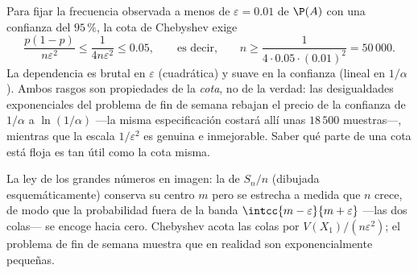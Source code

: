 \begin{example}\label{ex:b2:randomvar:llnnumeric}
Para fijar la frecuencia observada a menos de $\varepsilon = 0.01$ de
$\P(A)$ con una confianza del $95\,\%$, la cota de Chebyshev exige
\[
\frac{p(1-p)}{n\varepsilon^2} \leq \frac{1}{4n\varepsilon^2}
\leq 0.05,
\qquad\text{es decir,}\qquad
n \geq \frac{1}{4\cdot0.05\cdot(0.01)^2} = 50\,000 .
\]
La dependencia es brutal en $\varepsilon$ (cuadrática) y suave en la
confianza (lineal en $1/\alpha$). Ambos rasgos son propiedades de la
\emph{cota}, no de la verdad: las desigualdades exponenciales del
problema de fin de semana rebajan el precio de la confianza de
$1/\alpha$ a $\ln(1/\alpha)$ ---la misma especificación costará allí
unas $18\,500$ muestras---, mientras que la escala $1/\varepsilon^2$
es genuina e inmejorable. Saber qué parte de una cota está floja es
tan útil como la cota misma.
\end{example}

\begin{omfigure}

{\small La ley de los grandes números en imagen: la  de $S_n/n$
(dibujada esquemáticamente) conserva su centro $m$ pero se estrecha a
medida que $n$ crece, de modo que la probabilidad fuera de la banda
$\intcc{m-\varepsilon}{m+\varepsilon}$ ---las dos colas--- se encoge
hacia cero. Chebyshev acota las colas por $V(X_1)/(n\varepsilon^2)$;
el problema de fin de semana muestra que en realidad son
exponencialmente pequeñas.}
\end{omfigure}

